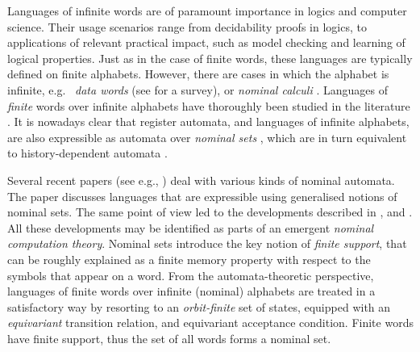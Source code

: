 


Languages of infinite words are of paramount importance in logics and computer science. Their usage scenarios range from decidability proofs in logics, 
 to applications of relevant practical impact, such as model checking and learning of logical properties. Just as in the case of finite words, these languages are typically defined on finite alphabets. However, there are cases in which the alphabet is infinite, e.g.\
\emph{data words} (see \cite{Seg06} for  a survey), or \emph{nominal calculi} \cite{MPW92}. Languages of \emph{finite} words over infinite alphabets have thoroughly been studied in the literature \cite{KF94,Tze11}. 
It is nowadays clear that register automata, and languages of infinite alphabets, are also expressible as automata over \emph{nominal sets} \cite{GP02}, which are in turn equivalent  to history-dependent automata \cite{Pistore99,SamPhD,GadducciMM06}. 

Several recent papers (see e.g., \cite{TOMOYUKI,GABBAYCIANCIAFOSSACS11}) deal with various kinds of nominal automata. The paper \cite{BojanczykDMSS11} discusses languages that are expressible using generalised notions of nominal sets. The same point of view led to the developments described in \cite{BojanczyPOPL12}, and \cite{PittsPOPL13}. All these developments may be identified as parts of an emergent
\emph{nominal computation theory}. Nominal sets introduce the key notion of \emph{finite support}, that can be roughly explained as a finite memory property with respect to the symbols that appear on a word. From the automata-theoretic perspective, languages of finite words over infinite (nominal) alphabets are treated in a satisfactory way by resorting to an \emph{orbit-finite} set of states, equipped with an \emph{equivariant} transition relation, and equivariant acceptance condition. Finite words have finite support, thus the set of all words forms a nominal set. 

